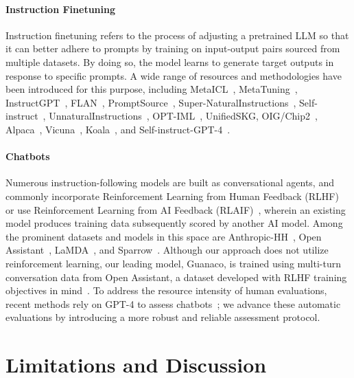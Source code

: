 \paragraph{Instruction Finetuning} Instruction finetuning refers to the process of adjusting a pretrained LLM so that it can better adhere to prompts by training on input-output pairs sourced from multiple datasets. By doing so, the model learns to generate target outputs in response to specific prompts. A wide range of resources and methodologies have been introduced for this purpose, including MetaICL~\citep{min2021metaicl}, MetaTuning~\citep{zhong2021adapting}, InstructGPT~\citep{ouyang2022training}, FLAN~\citep{wei2021finetuned,chung2022scaling}, PromptSource~\citep{bach2022promptsource}, Super-NaturalInstructions~\citep{wang2022super,sanh2021multitask}, Self-instruct~\citep{wang2022self}, UnnaturalInstructions~\citep{honovich2022unnatural}, OPT-IML~\citep{iyer2022opt}, UnifiedSKG\citep{xie2022unifiedskg}, OIG/Chip2~\citep{laion2023}, Alpaca~\citep{alpaca}, Vicuna~\citep{vicuna2023}, Koala~\citep{koala_blogpost_2023}, and Self-instruct-GPT-4~\citep{peng2023instruction}.

\paragraph{Chatbots} Numerous instruction-following models are built as conversational agents, and commonly incorporate Reinforcement Learning from Human Feedback (RLHF)~\citep{christiano2017deep} or use Reinforcement Learning from AI Feedback (RLAIF)~\citep{bai2022constitutional}, wherein an existing model produces training data subsequently scored by another AI model. Among the prominent datasets and models in this space are Anthropic-HH~\citep{askell2021general,bai2022training}, Open Assistant~\citep{kopf2023openassistant}, LaMDA~\citep{thoppilan2022lamda}, and Sparrow~\citep{glaese2022improving}. Although our approach does not utilize reinforcement learning, our leading model, Guanaco, is trained using multi-turn conversation data from Open Assistant, a dataset developed with RLHF training objectives in mind~\citep{kopf2023openassistant}. To address the resource intensity of human evaluations, recent methods rely on GPT-4 to assess chatbots~\citep{vicuna2023,peng2023instruction}; we advance these automatic evaluations by introducing a more robust and reliable assessment protocol.

\section{Limitations and Discussion}

